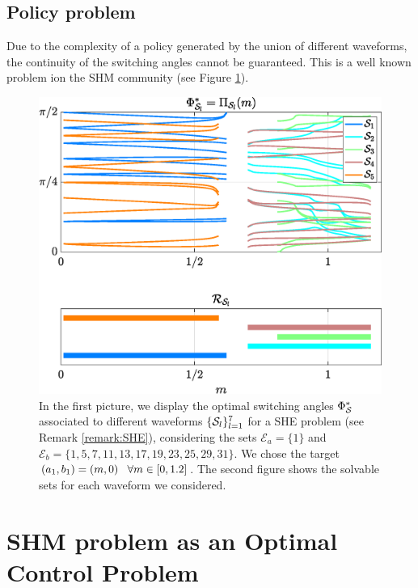 \documentclass[twocolumn]{autart}    %
\begin{document}
\subsection{Policy problem} \label{subsec:Non-continuous policy}
 
Due to the complexity of a policy generated by the union of different waveforms, the continuity of the switching angles cannot be guaranteed. This is a well known problem ion the SHM community \cite{Agelidis2008,Dahidah2008,Dahidah2015,Yang2017} (see Figure \ref{fig:chaos_policy}).
	
\begin{figure}[h]
	\centering
	\includegraphics[scale=0.35]{img/fig01a.eps}
	\caption{In the first picture, we display the optimal switching angles $\Phi^*_{\mathcal{S}}$ associated to different waveforms $\{\mathcal{S}_l\}_{l=1}^7$ for a SHE problem (see Remark \ref{remark:SHE}), considering the sets $\mathcal{E}_a = \{1\}$ and $\mathcal{E}_b = \{1,5,7,11,13,17,19,23,25,29,31\}$. We chose the target $(a_1,b_1) = (m,0) \hspace{0.5em} \forall m \in [0,1.2]$. The second figure shows the solvable sets for each waveform we considered.}
	\label{fig:chaos_policy}
\end{figure}

\section{SHM problem as an Optimal Control Problem}\label{sec:Contributions}
\end{document}
